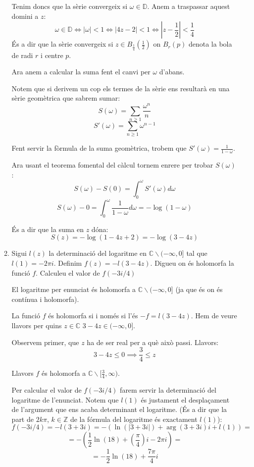 \documentclass[10pt,a4paper]{article}
\begin{document}
\begin{enumerate}
\begin{enumerate}
\begin{framed}
	Tenim doncs que la sèrie convergeix si $\omega\in\mathbb{D}$. Anem a traspassar aquest domini a $z$:
	$$\omega\in\mathbb{D} \Leftrightarrow |\omega|<1 \Leftrightarrow |4z-2|<1 \Leftrightarrow \left|z-\frac{1}{2}\right|<\frac{1}{4}$$
	És a dir que la sèrie convergeix si $z\in B_{\frac{1}{4}}\left(\frac{1}{2}\right)$ on $B_{r}(p)$ denota la bola de radi $r$ i centre $p$.
	
	Ara anem a calcular la suma fent el canvi per $\omega$ d'abans.
	
	Notem que si derivem un cop els termes de la sèrie ens resultarà en una sèrie geomètrica que sabrem sumar:	
	$$S(\omega)= \sum_{n\geq 1} \frac{\omega^{n}}{n}$$
	$$S'(\omega)= \sum_{n\geq 1} \omega^{n-1}$$
	
	Fent servir la fòrmula de la suma geomètrica, trobem que $S'(\omega)=\frac{1}{1-\omega}$.
	
	Ara usant el teorema fomental del càlcul tornem enrere per trobar $S(\omega)$:	
	$$S(\omega)-S(0) = \int_{0}^{\omega}S'(\omega)d\omega$$
	$$S(\omega)-0 = \int_{0}^{\omega}\frac{1}{1-\omega}d\omega = -\log(1-\omega)$$
	
	És a dir que la suma en $z$ dóna:	
	$$S(z) = -\log(1-4z+2) = -\log(3-4z)$$
	
	\end{framed}
	
	\item Sigui $l(z)$ la determinació del logaritme en $\mathbb{C}\backslash (-\infty,0]$ tal que $l(1)=-2\pi i$. Definim $f(z)=-l(3-4z)$. 
	Digueu on és holomorfa la funció $f$. Calculeu el valor de $f(-3i/4)$
	
	\begin{framed}
	
	El logaritme per enunciat és holomorfa a $\mathbb{C}\backslash (-\infty,0]$ (ja que és on és contínua i holomorfa).
	
	La funció $f$ és holomorfa si i només si l'és $-f=l(3-4z)$. Hem de veure llavors per quins $z\in\mathbb{C}$ $3-4z\in(-\infty,0]$.
	
	Observem primer, que $z$ ha de ser real per a què això passi. Llavors:
	$$3-4z\leq 0 \implies \frac{3}{4}\leq z$$
	
	Llavors $f$ és holomorfa a $\mathbb{C}\backslash [\frac{3}{4},\infty)$.
	
	Per calcular el valor de $f(-3i/4)$ farem servir la determinació del logaritme de l'enunciat. Notem que $l(1)$ és justament el desplaçament de l'argument que ens acaba determinant el logaritme. (És a dir que la part de $2k\pi$, $k\in\mathbb{Z}$ de la fórmula del logaritme és exactament $l(1)$):	
	$$f(-3i/4) = -l(3+3i) = -(\ln(|3+3i|) + \arg(3+3i)i + l(1)) = $$ 
	$$ = -\left(\frac{1}{2}\ln(18) + \left(\frac{\pi}{4}\right)i - 2\pi i\right) =$$
	$$ = -\frac{1}{2}\ln(18) + \frac{7\pi}{4}i $$	
	

\end{framed}
\end{enumerate}
\end{enumerate}
\end{document}
